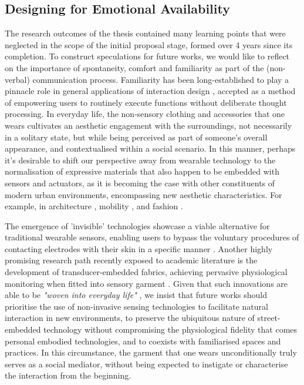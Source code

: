 \subsection{Designing for Emotional Availability}

The research outcomes of the thesis contained many learning points that were neglected in the scope of the initial proposal stage, formed over 4 years since its completion. To construct speculations for future works, we would like to reflect on the importance of spontaneity, comfort and familiarity as part of the (non-verbal) communication process. Familiarity has been long-established to play a pinnacle role in general applications of interaction design \cite{dix_starting_1998}, accepted as a method of empowering users to routinely execute functions without deliberate thought processing. In everyday life, the non-sensory clothing and accessories that one wears cultivates an aesthetic engagement with the surroundings, not necessarily in a solitary state, but while being perceived as part of someone's overall appearance, and contextualised within a social scenario. In this manner, perhaps it's desirable to shift our perspective away from wearable technology to the normalisation of expressive materials that also happen to be embedded with sensors and actuators, as it is becoming the case with other constituents of modern urban environments, encompassing new aesthetic characteristics. For example, in architecture \cite{alvarez_re-imagining_2017}, mobility \cite{nesmachnow_bus_2020}, and fashion \cite{bang_amp_olufsen_press_collaboration_2022}.

The emergence of 'invisible' technologies showcase a viable alternative for traditional wearable sensors, enabling users to bypass the voluntary procedures of contacting electrodes with their skin in a specific manner \cite{dos_santos_silva_design_2021}. Another highly promising research path recently exposed to academic literature is the development of transducer-embedded fabrics, achieving pervasive physiological monitoring when fitted into sensory garment \cite{yan_single_2022}. Given that such innovations are able to be \textit{"woven into everyday life"} \cite{song_smart_2022}, we insist that future works should prioritise the use of non-invasive sensing technologies to facilitate natural interaction in new environments, to preserve the ubiquitous nature of street-embedded technology without compromising the physiological fidelity that comes personal embodied technologies, and to coexists with familiarised spaces and practices. In this circumstance, the garment that one wears unconditionally truly serves as a social mediator, without being expected to instigate or characterise the interaction from the beginning.

